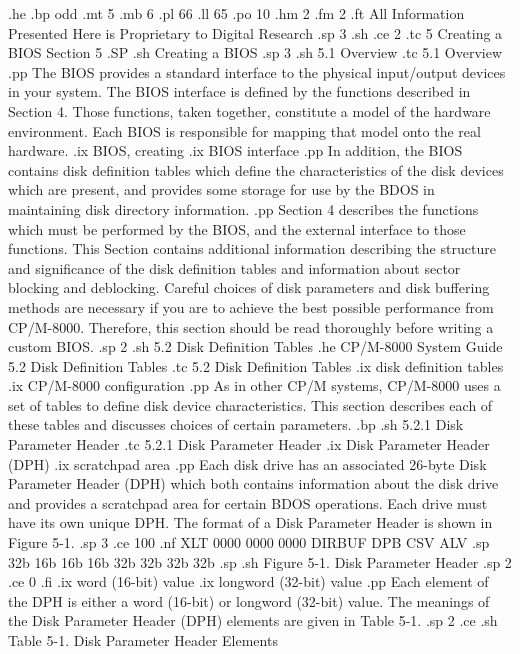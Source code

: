 .he
.bp odd
.mt 5
.mb 6
.pl 66
.ll 65
.po 10
.hm 2
.fm 2
.ft All Information Presented Here is Proprietary to Digital Research
.sp 3
.sh
.ce 2
.tc 5  Creating a BIOS
Section 5
.SP
.sh
Creating a BIOS
.sp 3
.sh
5.1  Overview
.tc    5.1  Overview
.pp
The BIOS provides a standard interface to the physical input/output devices
in your system.  The BIOS interface is defined by the functions
described in Section 4.  Those functions, taken together, constitute a model
of the hardware environment.  Each BIOS is responsible for mapping that 
model onto the real hardware.
.ix BIOS, creating
.ix BIOS interface
.pp
In addition, the BIOS contains disk definition tables which define 
the characteristics of the
disk devices which are present, and provides some storage for use by the BDOS
in maintaining disk directory information.
.pp
Section 4 describes the functions which must be performed by the BIOS, and the
external interface to those functions.  This Section contains additional
information describing the structure and significance of the disk definition
tables and information about sector blocking and deblocking.  Careful choices
of disk parameters and disk buffering methods are necessary if you are to
achieve the best possible performance from CP/M-8000.  Therefore, this section
should be read thoroughly before writing a custom BIOS.  
.sp 2
.sh
5.2  Disk Definition Tables
.he CP/M-8000 System Guide                 5.2  Disk Definition Tables
.tc    5.2  Disk Definition Tables
.ix disk definition tables
.ix CP/M-8000 configuration
.pp
As in other CP/M systems, CP/M-8000 uses a set of tables to define disk
device characteristics.  This section describes each of these tables
and discusses choices of certain parameters.
.bp
.sh
5.2.1  Disk Parameter Header
.tc         5.2.1  Disk Parameter Header
.ix Disk Parameter Header (DPH)
.ix scratchpad area
.pp
Each disk drive has an associated 26-byte Disk Parameter Header (DPH) 
which both contains information about the disk drive and
provides a scratchpad area for certain BDOS operations.  Each drive must
have its own unique DPH.  The format of a Disk Parameter Header is shown in 
Figure 5-1. 
.sp 3
.ce 100
.nf
     XLT    0000   0000   0000  DIRBUF   DPB     CSV     ALV
.sp
     32b     16b    16b    16b    32b    32b     32b     32b
.sp
.sh
Figure 5-1.  Disk Parameter Header 
.sp 2 
.ce 0
.fi
.ix word (16-bit) value
.ix longword (32-bit) value
.pp
Each element of the DPH is either a word (16-bit) or longword (32-bit) 
value.  The meanings of the Disk Parameter Header (DPH) elements are given
in Table 5-1.
.sp 2
.ce
.sh
Table 5-1.  Disk Parameter Header Elements
